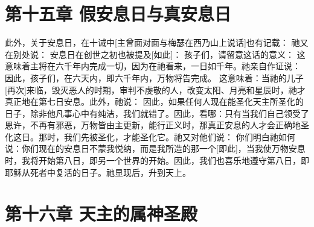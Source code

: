 
\section{第十五章 假安息日与真安息日}

此外，关于安息日，在十诫中[主曾面对面与梅瑟在西乃山上说话]也有记载：  祂又在别处说：  安息日在创世之初也被提及[如此]： 孩子们，请留意这话的意义： 这意味着主将在六千年内完成一切，因为在祂看来，一日如千年。祂亲自作证说： 因此，孩子们，在六天内，即六千年内，万物将告完成。 这意味着：当祂的儿子[再次]来临，毁灭恶人的时期，审判不虔敬的人，改变太阳、月亮和星辰时，祂才真正地在第七日安息。此外，祂说： 因此，如果任何人现在能圣化天主所圣化的日子，除非他凡事心中有纯洁，我们就错了。因此，看哪：只有当我们自己领受了恩许，不再有邪恶，万物皆由主更新，能行正义时，那真正安息的人才会正确地圣化这日。那时，我们先被圣化，才能圣化它。祂又对他们说：  你们明白祂如何说：你们现在的安息日不蒙我悦纳，而是我所造的那一个[即此]，当我使万物安息时，我将开始第八日，即另一个世界的开始。因此，我们也喜乐地遵守第八日，即耶稣从死者中复活的日子。祂显现后，升到天上。\par


\section{第十六章 天主的属神圣殿}


